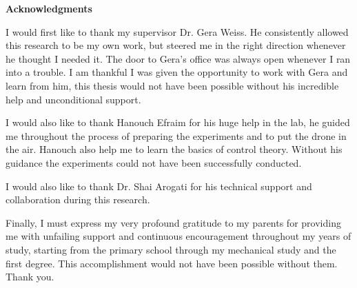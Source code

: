 \documentclass[../hodai_thesis.tex]{subfiles}
\begin{document}
\vspace{0.5cm}
\begin{center}
\LARGE \textbf{Acknowledgments}
\end{center}

I would first like to thank my supervisor Dr. Gera Weiss.
He consistently allowed this research to be my own work, but steered me in the right direction whenever he thought I needed it.
The door to Gera's office was always open whenever I ran into a trouble.
I am thankful I was given the opportunity to work with Gera and learn from him, this thesis would not have been possible without his incredible help and unconditional support.

I would also like to thank Hanouch Efraim for his huge help in the lab, he guided me throughout the process of preparing the experiments and to put the drone in the air. Hanouch also help me to learn the basics of control theory. Without his guidance the experiments could not have been successfully conducted.

I would also like to thank Dr. Shai Arogati for his technical support and collaboration during this research.  

Finally, I must express my very profound gratitude to my parents for providing me with unfailing support and continuous encouragement throughout my years of study, starting from the primary school through my mechanical study and the first degree. This accomplishment would not have been possible without them. Thank you.
\end{document}
